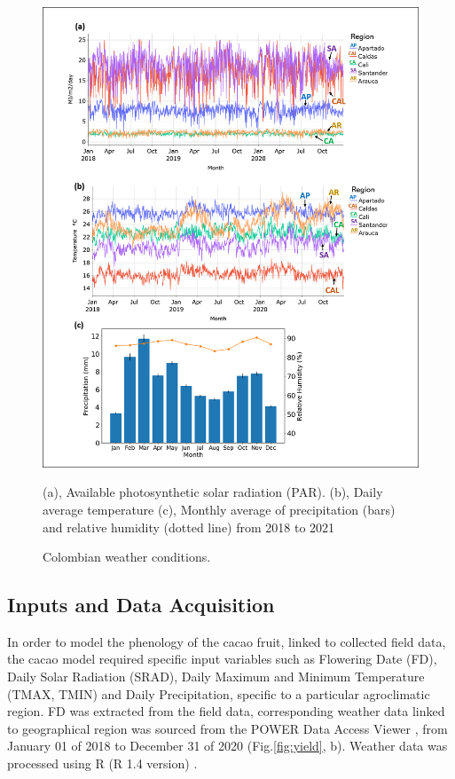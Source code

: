 \documentclass[gene,journal,article,submit,moreauthors,pdftex]{Definitions/mdpi}
\begin{document}
\begin{figure}[h!]
	\centering
	\includegraphics[scale=0.4]{images/clima.png}
	\caption{\footnotesize {Colombian weather conditions. \\}}	
	\label{fig:temp}
	{\footnotesize (a), Available photosynthetic solar radiation (PAR). (b), Daily average temperature  (c), Monthly average of precipitation (bars) and relative humidity (dotted line) from 2018 to 2021 }
\end{figure}
\newpage



\subsection{Inputs and Data Acquisition }

In order to model the phenology of the cacao fruit, linked to collected field data, the cacao model required specific input variables such as Flowering Date (FD), Daily Solar Radiation (SRAD), Daily Maximum and Minimum Temperature (TMAX, TMIN) and Daily Precipitation, specific to a particular agroclimatic region. FD was extracted from the field data, corresponding weather data linked to geographical region was sourced from the POWER Data Access Viewer \citep{nasapower}, from January 01 of 2018 to December 31 of 2020 (Fig.\ref{fig:yield}, b). Weather data was processed using R (R 1.4 version) \citep{Rstudio2020}. 
\end{document}
